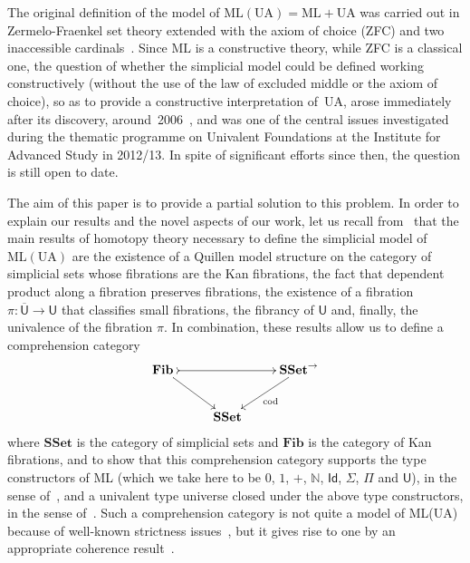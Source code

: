 \documentclass[reqno,10pt,a4paper,oneside]{amsart}
\numberwithin{equation}{section}
\theoremstyle{mythm}
\theoremstyle{mydef}
\theoremstyle{myrmk}
\newcommand{\ie}{\text{i.e.\ }}
\newcommand{\co}{\colon}
\newcommand{\SSet}{\mathbf{SSet}}
\newcommand{\UU}{\overline{\mathsf{U}}}
\newcommand{\U}{\mathsf{U}}
\begin{document}
The original definition of the model of $\mathrm{ML(UA)} = \mathrm{ML} + \mathrm{UA}$ was carried out in  Zermelo-Fraenkel set theory extended with the axiom of choice (ZFC) and two inaccessible cardinals~\cite[Theorem~3.4.3]{voevodsky-simplicial-model}. Since $\mathrm{ML}$ is a constructive theory, 
while ZFC is a classical one, the question of whether the simplicial model could be defined working constructively (\ie without the use of the law of excluded middle or the axiom of choice), so as to provide a constructive interpretation of~$\mathrm{UA}$, arose immediately after its discovery, around~2006~\cite{KapulkinC:uniss,StreicherT:modtts,VoevodskyV:notts}, and was one of the central issues investigated during the thematic programme on Univalent Foundations at the Institute for Advanced Study in 2012/13. In spite of  significant efforts since then, the question is still open to date.

The aim of this paper is to provide a partial solution to this problem.  In order to
explain our results and the novel aspects of our work, let us recall from~\cite{voevodsky-simplicial-model} that the main results of  homotopy theory necessary 
to define the simplicial model of $\mathrm{ML(UA)}$ are 
the existence of a Quillen
model structure on the category of simplicial sets whose fibrations are the Kan fibrations, 
 the fact that dependent product along a fibration preserves fibrations,
 the existence of a fibration $\pi \co \UU \to \U$ that classifies small fibrations, 
the fibrancy of $\U$ and, finally, the univalence of the fibration $\pi$. In combination, these results
allow us to define a comprehension category 
\[
\begin{gathered}
\xymatrix{
\mathbf{Fib}\,  \ar[dr] \ar@{>->}[rr] & & \SSet^{\to} \ar[dl]^{\mathrm{cod}} \\ 
 & \SSet &  }
 \end{gathered}
\]
where $\SSet$ is the category of simplicial sets 
and $\mathbf{Fib}$ is the category of Kan fibrations, 
and to show that this comprehension category supports the type
constructors of ML (which we take here to be $0$, $1$, $+$, $\mathbb{N}$, 
$\mathsf{Id}$, $\Sigma$, $\Pi$ and $\mathsf{U}$),
in the sense of~\cite{LumsdaineP:locuoc},  and a univalent type universe closed under the above type
constructors,  in the sense of~\cite{ShulmanM:allths}. Such a comprehension category is not quite a 
model of ML(UA) because of well-known strictness issues~\cite{HofmannM:intttl}, but it gives rise to one
by an appropriate coherence result~\cite{voevodsky-simplicial-model,LumsdaineP:locuoc}.
\end{document}
